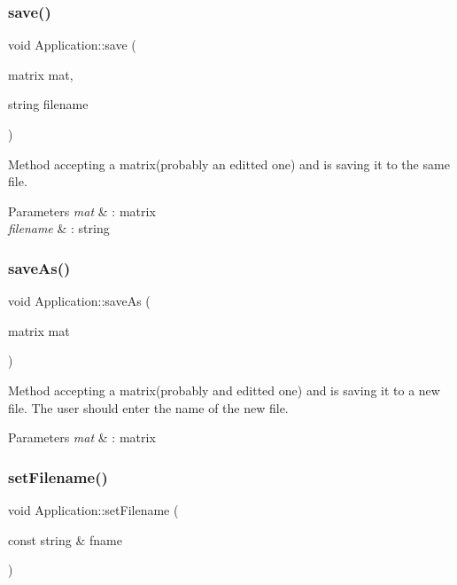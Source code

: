 \subsubsection{\texorpdfstring{save()}{save()}}
{\footnotesize\ttfamily void Application\+::save (\begin{DoxyParamCaption}\item[{matrix}]{mat,  }\item[{string}]{filename }\end{DoxyParamCaption})}

Method accepting a matrix(probably an editted one) and is saving it to the same file. 
\begin{DoxyParams}{Parameters}
{\em mat} & \+: matrix \\
\hline
{\em filename} & \+: string \\
\hline
\end{DoxyParams}
\mbox{\label{class_application_a26cc9a5dcdf0eebb9e89f6b3a8fa64dd}} 
\subsubsection{\texorpdfstring{save\+As()}{saveAs()}}
{\footnotesize\ttfamily void Application\+::save\+As (\begin{DoxyParamCaption}\item[{matrix}]{mat }\end{DoxyParamCaption})}

Method accepting a matrix(probably and editted one) and is saving it to a new file. The user should enter the name of the new file. 
\begin{DoxyParams}{Parameters}
{\em mat} & \+: matrix \\
\hline
\end{DoxyParams}
\mbox{\label{class_application_a76de879568ee39ac80484441716928d2}} 
\subsubsection{\texorpdfstring{set\+Filename()}{setFilename()}}
{\footnotesize\ttfamily void Application\+::set\+Filename (\begin{DoxyParamCaption}\item[{const string \&}]{fname }\end{DoxyParamCaption})}

